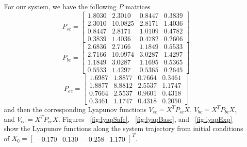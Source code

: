 \documentclass[conference]{IEEEtran}
\begin{document}
For our system, we have the following $P$ matrices 
\begin{equation}
P_{sc}=\left[ \begin{array}{cccc} 1.8030 & 2.3010 & 0.8447 & 0.3839 \\ 2.3010 &  10.0825 &   2.8171 &   1.4036 \\ 0.8447 &   2.8171 &   1.0109 &   0.4782 \\ 0.3839 &    1.4036 &   0.4782 &   0.2606 \end{array} \right]
\label{eq:lyapSafeP}
\end{equation}
\begin{equation}
P_{bc}=\left[\begin{array}{cccc} 2.6836 &   2.7166 &   1.1849 &   0.5533 \\ 2.7166  & 10.0974 &   3.0287 &   1.4297 \\ 1.1849   & 3.0287 &   1.1695 &   0.5365 \\ 0.5533   & 1.4297 &   0.5365 &   0.2645\end{array}\right]
\label{eq:lyapBaseP}
\end{equation}
\begin{equation}
P_{ec}=\left[\begin{array}{cccc} 1.6987 &   1.8877 &   0.7664 &   0.3461 \\ 1.8877 &   8.8812 &   2.5537 &   1.1747\\ 0.7664 &   2.5537 &   0.9601 &   0.4318\\ 0.3461 &   1.1747 &   0.4318 &   0.2050\end{array}\right]
\label{eq:lyapExpP}
\end{equation}
and then the corresponding Lyapunov functions $V_{sc}=X^TP_{sc}X$, $V_{bc}=X^TP_{bc}X$, and $V_{ec}=X^TP_{ec}X$.  Figures ~\ref{fig:lyapSafe}, ~\ref{fig:lyapBase}, and ~\ref{fig:lyapExp} show the Lyapunov functions along the system trajectory from initial conditions of $X_{0}=\left[\begin{array}{cccc} -0.170 & 0.130 & -0.258 & 1.170 \end{array}\right]^T$.
\end{document}
